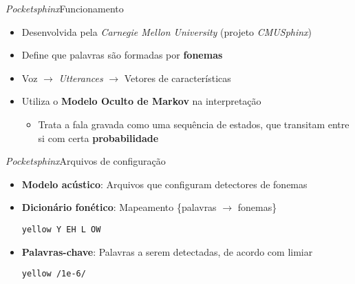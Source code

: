 \begin{frame}{\textit{Pocketsphinx}}{Funcionamento}

\begin{itemize}
\item Desenvolvida pela \textit{Carnegie Mellon University} (projeto \textit{CMUSphinx})

\item Define que palavras são formadas por \textbf{fonemas}

\item<2-> Voz $\rightarrow$ \textit{Utterances} $\rightarrow$ Vetores de características

\item<3-> Utiliza o \textbf{Modelo Oculto de Markov} na interpretação

\begin{itemize}
  \item Trata a fala gravada como uma sequência de estados, que transitam entre si com certa \textbf{probabilidade}
\end{itemize}
\end{itemize}


\end{frame}


\begin{frame}{\textit{Pocketsphinx}}{Arquivos de configuração}

\begin{itemize}
\item \textbf{Modelo acústico}: Arquivos que configuram detectores de fonemas

\item<2-> \textbf{Dicionário fonético}: Mapeamento \{palavras \(\rightarrow\) fonemas\}

\begin{center}
  \color{Maroon}\texttt{yellow Y EH L OW}
\end{center}

\item<3-> \textbf{Palavras-chave}: Palavras a serem detectadas, de acordo com limiar

\begin{center}
  \color{Maroon}\texttt{yellow /1e-6/}
\end{center}

\end{itemize}
\end{frame}
